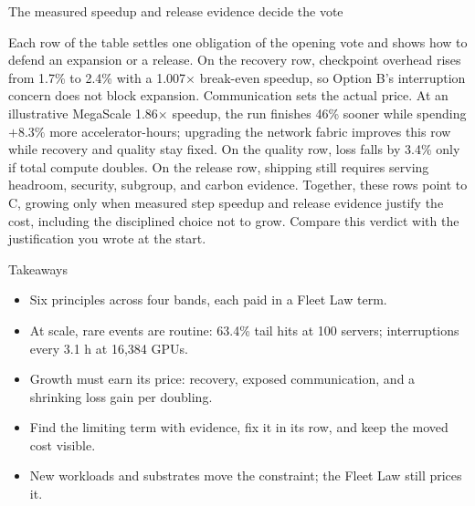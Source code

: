 \documentclass[aspectratio=169, 12pt]{beamer}
\begin{document}
\begin{frame}{The measured speedup and release evidence decide the vote}
{  Each row of the table settles one obligation of the opening vote and shows how to defend an expansion or a release. On the recovery row, checkpoint overhead rises from 1.7\% to 2.4\% with a 1.007$\times$ break-even speedup, so Option B's interruption concern does not block expansion. Communication sets the actual price. At an illustrative MegaScale 1.86$\times$ speedup, the run finishes 46\% sooner while spending $+8.3\%$ more accelerator-hours; upgrading the network fabric improves this row while recovery and quality stay fixed. On the quality row, loss falls by 3.4\% only if total compute doubles. On the release row, shipping still requires serving headroom, security, subgroup, and carbon evidence. Together, these rows point to C, growing only when measured step speedup and release evidence justify the cost, including the disciplined choice not to grow. Compare this verdict with the justification you wrote at the start.


}
\end{frame}

\begin{frame}{Takeaways}
  \normalsize
  \begin{itemize}\setlength{\itemsep}{0.26cm}
    \item Six principles across four bands, each paid in a Fleet Law term.
    \item At scale, rare events are routine: 63.4\% tail hits at 100 servers; interruptions every 3.1 h at 16,384 GPUs.
    \item Growth must earn its price: recovery, exposed communication, and a shrinking loss gain per doubling.
    \item Find the limiting term with evidence, fix it in its row, and keep the moved cost visible.
    \item New workloads and substrates move the constraint; the Fleet Law still prices it.
  \end{itemize}
\end{frame}
\end{document}
